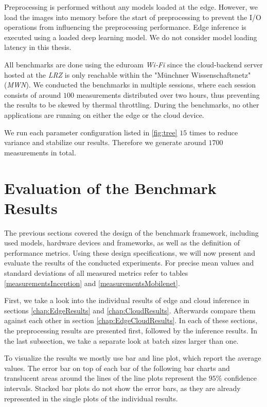 Preprocessing is performed without any models loaded at the edge. However, we load the images into memory before the start of preprocessing to prevent the I/O operations from influencing the preprocessing performance.
Edge inference is executed using a loaded deep learning model. 
We do not consider model loading latency in this thesis.

All benchmarks are done using the eduroam \emph{Wi‑Fi} since the cloud-backend server hosted at the \emph{LRZ} is only reachable within the "Münchner Wissenschaftsnetz" (\emph{MWN}).
We conducted the benchmarks in multiple sessions, where each session consists of around  $100$ measurements distributed over two hours, thus preventing the results to be skewed by thermal throttling.
During the benchmarks, no other applications are running on either the edge or the cloud device.

We run each parameter configuration listed in \ref{fig:tree} $15$ times to reduce variance and stabilize our results. Therefore we generate around $1700$ measurements in total.
\section{Evaluation of the Benchmark Results}
\label{chap:Evaluation}
The previous sections covered the design of the benchmark framework, including used models, hardware devices and frameworks, as well as the definition of performance metrics. Using these design specifications, we will now present and evaluate the results of the conducted experiments.
For precise mean values and standard deviations of all measured metrics refer to tables \ref{measurementsInception} and \ref{measurementsMobilenet}.

First, we take a look into the individual results of edge and cloud inference in sections \ref{chap:EdgeResults} and \ref{chap:CloudResults}.
Afterwards compare them against each other in section \ref{chap:EdgeCloudResults}. In each of these sections, the preprocessing results are presented first, followed by the inference results.
In the last subsection, we take a separate look at batch sizes larger than one.

To visualize the results we mostly use bar and line plot, which report the average values.
The error bar on top of each bar of the following bar charts and translucent areas around the lines of the line plots represent the $95\%$ confidence intervals.
Stacked bar plots do not show the error bars, as they are  already represented in the single plots of the individual results.

